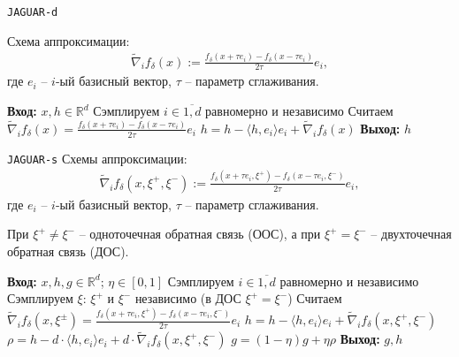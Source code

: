 \documentclass{beamer}
\begin{document}

\begin{frame}{\texttt{JAGUAR-d}}

    Схема аппроксимации:
    \begin{align*}
        \widetilde{\nabla}_i f_\delta (x) :=  \frac{f_\delta (x + \tau e_i) - f_\delta(x - \tau e_i)}{2 \tau} e_i,
    \end{align*}
    где $e_i$ -- $i$-ый базисный вектор, $\tau$ -- параметр сглаживания.
    
    \begin{algorithm}[H]
        \caption{}
        \begin{algorithmic}[1]
            \State \textbf{Вход:} $x, h \in \mathbb{R}^d$
            \State Сэмплируем $i \in \overline{1, d}$ равномерно и независимо
            \State Считаем $\widetilde{\nabla}_i f_\delta (x) = \frac{f_\delta (x + \tau e_i) - f_\delta (x - \tau e_i)}{2 \tau} e_i$
            \State $h = h - \langle h, e_i \rangle e_i + \widetilde{\nabla}_i f_\delta (x)$
            \State \textbf{Выход:} $h$
        \end{algorithmic}
    \end{algorithm}
        
\end{frame}


\begin{frame}{\texttt{JAGUAR-s}}
    Схемы аппроксимации:
        \begin{align*}
            \widetilde{\nabla}_i f_\delta (x, \xi^+, \xi^-) :=  \frac{f_\delta (x + \tau e_i, \xi^+) - f_\delta (x - \tau e_i, \xi^-)}{2 \tau} e_i,
        \end{align*}
    где $e_i$ -- $i$-ый базисный вектор, $\tau$ -- параметр сглаживания.
    
    При $\xi^+ \not = \xi^-$ -- одноточечная обратная связь (ООС), а при $\xi^+ = \xi^-$ -- двухточечная обратная связь (ДОС).
    
    \begin{algorithm}[H]
        \caption{}
        \begin{algorithmic}[1]
            \State \textbf{Вход:} $x, h, g \in \mathbb{R}^d$; $\eta \in [0, 1]$
            \State Сэмплируем $i \in \overline{1, d}$ равномерно и независимо
            \State Сэмплируем $\xi$: $\xi^+$ и $\xi^-$ независимо (в ДОС $\xi^+ = \xi^-$)
            \State Считаем $\widetilde{\nabla}_i f_\delta (x, \xi^\pm) = \frac{f_\delta (x + \tau e_i, \xi^+) - f_\delta (x - \tau e_i, \xi^-)}{2 \tau} e_i$
            \State $h = h - \langle h, e_i \rangle e_i + \widetilde{\nabla}_i f_\delta (x, \xi^+, \xi^-)$
            \State $\rho = h - d \cdot \langle h, e_i \rangle e_i + d \cdot \widetilde{\nabla}_i f_\delta (x, \xi^+, \xi^-)$
            \State $g = (1 - \eta) g + \eta \rho$ 
            \State \textbf{Выход:} $g, h$
        \end{algorithmic}
    \end{algorithm}
\end{frame}
\end{document}
